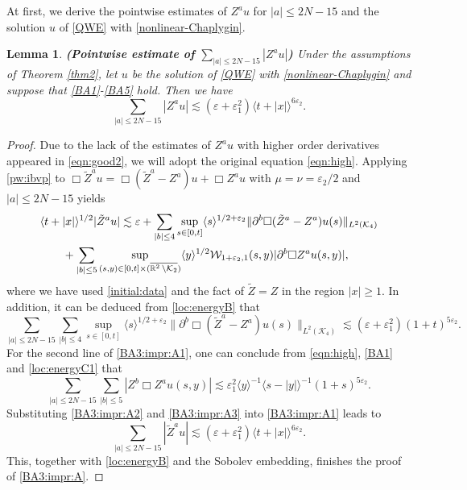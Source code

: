 \documentclass[11pt,twoside]{article}
\def\cK{\mathcal K}
\def\cW{\mathcal W}
\def\R{\mathop{\mathbb R\kern 0pt}\nolimits}
\def\ds{\displaystyle}
\def\p{\partial}
\def\ve{\varepsilon}
\def\ls{\lesssim}
\newcommand{\w}[1]{\langle {#1} \rangle}
\theoremstyle{plain}
\newtheorem{lemma}[theorem]{Lemma}
\theoremstyle{definition}
\numberwithin{equation}{section}
\begin{document}
At first, we derive the pointwise estimates of $Z^au$ for $|a|\le2N-15$ and the solution
$u$ of \eqref{QWE} with \eqref{nonlinear-Chaplygin}.
\begin{lemma}\label{lem:BA3:A}
{\bf (Pointwise estimate of $\ds\sum_{|a|\le2N-15}|Z^au|$)}
Under the assumptions of Theorem \ref{thm2}, let $u$ be the solution of \eqref{QWE} with \eqref{nonlinear-Chaplygin}
and suppose that \eqref{BA1}-\eqref{BA5} hold.
Then we have
\begin{equation}\label{BA3:impr:A}
\sum_{|a|\le2N-15}|Z^au|\ls(\ve+\ve_1^2)\w{t+|x|}^{6\ve_2}.
\end{equation}
\end{lemma}
\begin{proof}
Due to the lack of the estimates of $Z^au$ with higher order derivatives appeared in \eqref{eqn:good2}, we will adopt the original
equation \eqref{eqn:high}.
Applying \eqref{pw:ibvp} to $\Box\tilde Z^au=\Box(\tilde Z^a-Z^a)u+\Box Z^au$ with $\mu=\nu=\ve_2/2$ and $|a|\le2N-15$ yields
\begin{equation}\label{BA3:impr:A1}
\begin{split}
&\w{t+|x|}^{1/2}|\tilde Z^au|\ls\ve+\sum_{|b|\le4}\sup_{s\in[0,t]}\w{s}^{1/2+\ve_2}\|\p^b\Box(\tilde Z^a-Z^a)u(s)\|_{L^2(\cK_4)}\\
&\qquad+\sum_{|b|\le5}\sup_{(s,y)\in[0,t]\times(\overline{\R^2\setminus\cK_2})}\w{y}^{1/2}\cW_{1+\ve_2,1}(s,y)|\p^b\Box Z^au(s,y)|,
\end{split}
\end{equation}
where we have used \eqref{initial:data} and the fact of $\tilde Z=Z$ in the region $|x|\ge1$.
In addition, it can be deduced from \eqref{loc:energyB} that
\begin{equation}\label{BA3:impr:A2}
\sum_{|a|\le2N-15}\sum_{|b|\le4}\sup_{s\in[0,t]}\w{s}^{1/2+\ve_2}\|\p^b\Box(\tilde Z^a-Z^a)u(s)\|_{L^2(\cK_4)}
\ls(\ve+\ve_1^2)(1+t)^{5\ve_2}.
\end{equation}
For the second line of \eqref{BA3:impr:A1}, one can conclude from \eqref{eqn:high}, \eqref{BA1} and \eqref{loc:energyC1} that
\begin{equation}\label{BA3:impr:A3}
\sum_{|a|\le2N-15}\sum_{|b|\le5}|Z^b\Box Z^au(s,y)|
\ls\ve_1^2\w{y}^{-1}\w{s-|y|}^{-1}(1+s)^{5\ve_2}.
\end{equation}
Substituting \eqref{BA3:impr:A2} and \eqref{BA3:impr:A3} into \eqref{BA3:impr:A1} leads to
\begin{equation*}
\sum_{|a|\le2N-15}|\tilde Z^au|\ls(\ve+\ve_1^2)\w{t+|x|}^{6\ve_2}.
\end{equation*}
This, together with \eqref{loc:energyB} and the Sobolev embedding, finishes the proof of \eqref{BA3:impr:A}.
\end{proof}
\end{document}
